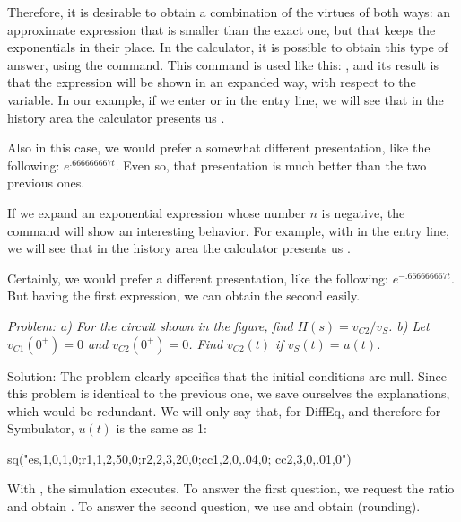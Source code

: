 Therefore, it is desirable to obtain a combination of the virtues of
both ways: an approximate expression that is smaller than the exact
one, but that keeps the exponentials in their place. In the
calculator, it is possible to obtain this type of answer, using the
 command. This command is used like this:
, and its result is that the
expression will be shown in an expanded way, with respect to the
variable. In our example, if we enter 
or  in the entry line, we will
see that in the history area the calculator presents us
.

Also in this case, we would prefer a somewhat different
presentation, like the following: $e^{.666666667t}$. Even so, that
presentation is much better than the two previous ones.

If we expand an exponential expression whose number $n$ is negative,
the  command will show an interesting behavior. For
example, with  in the entry line, we
will see that in the history area the calculator presents us
.

Certainly, we would prefer a different presentation, like the
following: $e^{-.666666667t}$. But having the first expression, we
can obtain the second easily.


\emph{Problem: a) For the circuit shown in the figure, find
$H(s) = v_{C2}/v_S$. b) Let $v_{C1}(0^{+}) = 0$ and
$v_{C2}(0^{+}) = 0$. Find $v_{C2}(t)$ if $v_S(t) = u(t)$.}

Solution: The problem clearly specifies that the initial conditions
are null. Since this problem is identical to the previous one, we
save ourselves the explanations, which would be redundant. We will
only say that, for DiffEq, and therefore for Symbulator, $u(t)$ is
the same as 1:

\begin{entry}
sq\fd("es,1,0,1,0;r1,1,2,50,0;r2,2,3,20,0;cc1,2,0,.04,0;
      cc2,3,0,.01,0")
\end{entry}

With , the simulation executes. To answer the first
question, we request the ratio  and obtain
. To answer the second question, we
use  and obtain
(rounding).

